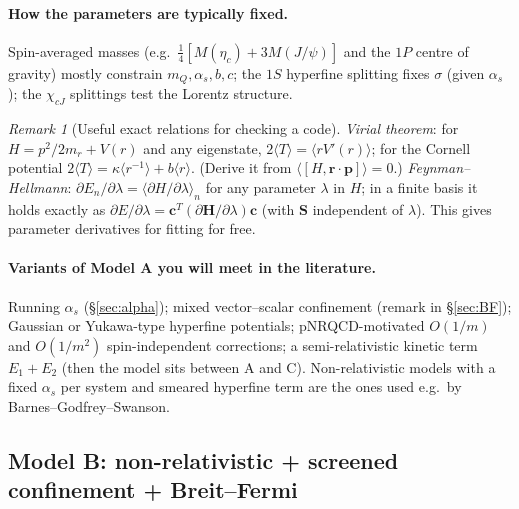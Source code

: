 \documentclass[11pt,a4paper]{article}
\numberwithin{equation}{section}
\theoremstyle{definition}
\theoremstyle{plain}
\theoremstyle{remark}
\newtheorem{remark}[definition]{Remark}
\numberwithin{algorithm}{section}
\newcommand{\vr}{\bm r}
\newcommand{\vp}{\bm p}
\newcommand{\as}{\alpha_s}
\newcommand{\mr}{m_r}
\newcommand{\mH}{\mathbf H}
\newcommand{\mS}{\mathbf S}
\newcommand{\vc}{\bm c}
\begin{document}
\paragraph{How the parameters are typically fixed.} Spin-averaged masses (e.g.\ $\frac14[M(\eta_c)+3M(J/\psi)]$ and the $1P$ centre of gravity) mostly constrain $m_Q,\as,b,c$; the $1S$ hyperfine splitting fixes $\sigma$ (given $\as$); the $\chi_{cJ}$ splittings test the Lorentz structure.

\begin{remark}[Useful exact relations for checking a code]
\emph{Virial theorem}: for $H=p^2/2\mr+V(r)$ and any eigenstate, $2\langle T\rangle=\langle rV'(r)\rangle$; for the Cornell potential $2\langle T\rangle=\kappa\langle r^{-1}\rangle+b\langle r\rangle$. (Derive it from $\langle[H,\vr\!\cdot\!\vp]\rangle=0$.)
\emph{Feynman--Hellmann}: $\partial E_n/\partial\lambda=\langle\partial H/\partial\lambda\rangle_n$ for any parameter $\lambda$ in $H$; in a finite basis it holds exactly as $\partial E/\partial\lambda=\vc^T(\partial\mH/\partial\lambda)\vc$ (with $\mS$ independent of $\lambda$). This gives parameter derivatives for fitting for free.
\end{remark}

\paragraph{Variants of Model A you will meet in the literature.} Running $\as$ (\S\ref{sec:alpha}); mixed vector--scalar confinement (remark in \S\ref{sec:BF}); Gaussian or Yukawa-type hyperfine potentials; pNRQCD-motivated $O(1/m)$ and $O(1/m^2)$ spin-independent corrections; a semi-relativistic kinetic term $E_1+E_2$ (then the model sits between A and C). Non-relativistic models with a fixed $\as$ per system and smeared hyperfine term are the ones used e.g.\ by Barnes--Godfrey--Swanson.

\subsection{Model B: non-relativistic + screened confinement + Breit--Fermi}\label{sec:modelB}
\end{document}
